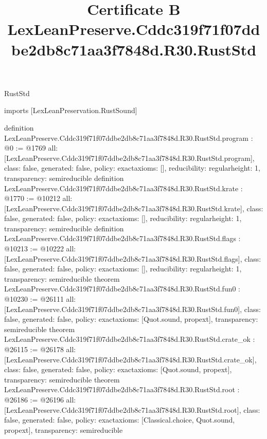 \begin{lexlean}{RustStd}
\title{Certificate B LexLeanPreserve.Cddc319f71f07ddbe2db8c71aa3f7848d.R30.RustStd}
\begin{coremodule}
imports [LexLeanPreservation.RustSound]

definition LexLeanPreserve.Cddc319f71f07ddbe2db8c71aa3f7848d.R30.RustStd.program : @0 := @1769 {
  all: [LexLeanPreserve.Cddc319f71f07ddbe2db8c71aa3f7848d.R30.RustStd.program],
  class: false,
  generated: false,
  policy: exact{axioms: []},
  reducibility: regular{height: 1},
  transparency: semireducible
}
definition LexLeanPreserve.Cddc319f71f07ddbe2db8c71aa3f7848d.R30.RustStd.krate : @1770 := @10212 {
  all: [LexLeanPreserve.Cddc319f71f07ddbe2db8c71aa3f7848d.R30.RustStd.krate],
  class: false,
  generated: false,
  policy: exact{axioms: []},
  reducibility: regular{height: 1},
  transparency: semireducible
}
definition LexLeanPreserve.Cddc319f71f07ddbe2db8c71aa3f7848d.R30.RustStd.flags : @10213 := @10222 {
  all: [LexLeanPreserve.Cddc319f71f07ddbe2db8c71aa3f7848d.R30.RustStd.flags],
  class: false,
  generated: false,
  policy: exact{axioms: []},
  reducibility: regular{height: 1},
  transparency: semireducible
}
theorem LexLeanPreserve.Cddc319f71f07ddbe2db8c71aa3f7848d.R30.RustStd.fun0 : @10230 := @26111 {
  all: [LexLeanPreserve.Cddc319f71f07ddbe2db8c71aa3f7848d.R30.RustStd.fun0],
  class: false,
  generated: false,
  policy: exact{axioms: [Quot.sound, propext]},
  transparency: semireducible
}
theorem LexLeanPreserve.Cddc319f71f07ddbe2db8c71aa3f7848d.R30.RustStd.crate_ok : @26115 := @26178 {
  all: [LexLeanPreserve.Cddc319f71f07ddbe2db8c71aa3f7848d.R30.RustStd.crate_ok],
  class: false,
  generated: false,
  policy: exact{axioms: [Quot.sound, propext]},
  transparency: semireducible
}
theorem LexLeanPreserve.Cddc319f71f07ddbe2db8c71aa3f7848d.R30.RustStd.root : @26186 := @26196 {
  all: [LexLeanPreserve.Cddc319f71f07ddbe2db8c71aa3f7848d.R30.RustStd.root],
  class: false,
  generated: false,
  policy: exact{axioms: [Classical.choice, Quot.sound, propext]},
  transparency: semireducible
}


\end{coremodule}
\end{lexlean}
